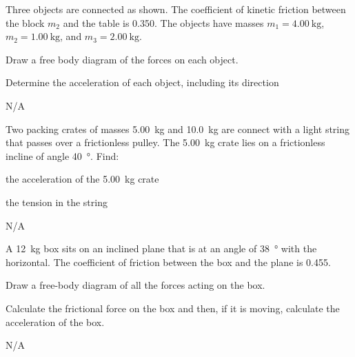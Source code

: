 \begin{question}[ID=friction-A-Q05,topic=friction,difficulty=A]
    Three objects are connected as shown.
    The coefficient of kinetic friction between the block
        $m_2$ and the table is \num{0.350}.
    The objects have masses $m_1=\SI{4.00}{\kilo\gram}$,
        $m_2=\SI{1.00}{\kilo\gram}$, and
        $m_3=\SI{2.00}{\kilo\gram}$.
    \begin{enumerate*}[label=\arabic*)]
        \item Draw a free body diagram of the forces on each object.
        \item Determine the acceleration of each object, including its direction
    \end{enumerate*}
\end{question}
\begin{solution}
    N/A
\end{solution}


\begin{question}[ID=friction-A-Q06,topic=friction,difficulty=A]
    Two packing crates of masses \SI{5.00}{\kilo\gram}
        and \SI{10.0}{\kilo\gram} are connect with a light
        string that passes over a frictionless pulley.
    The \SI{5.00}{\kilo\gram} crate lies on a frictionless
        incline of angle \SI{40}{\degree}.
    Find:
    \begin{enumerate*}[label=\arabic*)]
        \item the acceleration of the \SI{5.00}{\kilo\gram} crate
        \item the tension in the string
    \end{enumerate*}
\end{question}
\begin{solution}
    N/A
\end{solution}


\begin{question}[ID=friction-B-Q01,topic=friction,difficulty=B]
    A \SI{12}{\kilo\gram} box sits on an inclined plane that
        is at an angle of \SI{38}{\degree} with the horizontal.
    The coefficient of friction between the box and the plane
        is \num{0.455}.
    \begin{enumerate*}[label=\arabic*)]
        \item Draw a free-body diagram of all the forces acting on the box.
        \item Calculate the frictional force on the box and then,
            if it is moving, calculate the acceleration of the box.
    \end{enumerate*}
\end{question}
\begin{solution}
    N/A
\end{solution}


